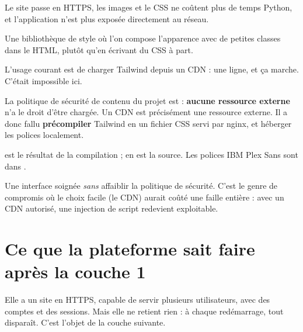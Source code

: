 \apport
Le site passe en HTTPS, les images et le CSS ne coûtent plus de temps Python, et
l'application n'est plus exposée directement au réseau.


\quoi
Une bibliothèque de style où l'on compose l'apparence avec de petites classes
dans le HTML, plutôt qu'en écrivant du CSS à part.

\pourquoi
L'usage courant est de charger Tailwind depuis un CDN : une ligne, et ça marche.
C'était impossible ici.

La politique de sécurité de contenu du projet est  :
\textbf{aucune ressource externe} n'a le droit d'être chargée. Un CDN est
précisément une ressource externe. Il a donc fallu \textbf{précompiler} Tailwind
en un fichier CSS servi par nginx, et héberger les polices localement.

\role
{} est le résultat de la compilation ;
 en est la source. Les polices IBM Plex Sans sont dans
.

\apport
Une interface soignée \emph{sans} affaiblir la politique de sécurité. C'est le
genre de compromis où le choix facile (le CDN) aurait coûté une faille entière :
avec un CDN autorisé, une injection de script redevient exploitable.


\section*{Ce que la plateforme sait faire après la couche 1}

Elle a un site en HTTPS, capable de servir plusieurs utilisateurs, avec des
comptes et des sessions. Mais elle ne retient rien : à chaque redémarrage, tout
disparaît. C'est l'objet de la couche suivante.
